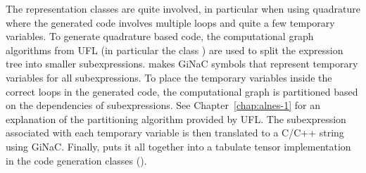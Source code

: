 The representation classes are quite involved, in particular when
using quadrature where the generated code involves multiple loops and
quite a few temporary variables. To generate quadrature based code,
the computational graph algorithms from UFL (in particular the class
) are used to split the expression tree into smaller
subexpressions.  \sfc{} makes GiNaC symbols that represent temporary
variables for all subexpressions.  To place the temporary variables
inside the correct loops in the generated code, the computational
graph is partitioned based on the dependencies of subexpressions. See
Chapter~\ref{chap:alnes-1} for an explanation of the partitioning
algorithm provided by UFL. The subexpression associated with
each temporary variable is then translated to a C/C++ string using
GiNaC. Finally, \sfc{} puts it all together into a tabulate tensor
implementation in the code generation classes ().
